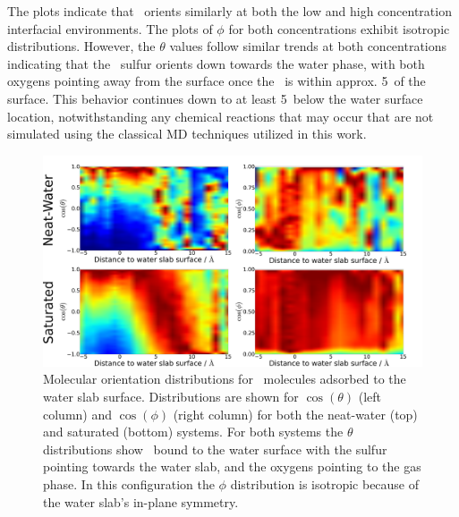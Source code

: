 The plots indicate that \suldiox~orients similarly at both the low and high concentration interfacial environments. The plots of $\phi$ for both concentrations exhibit isotropic distributions. However, the $\theta$ values follow similar trends at both concentrations indicating that the \suldiox~sulfur orients down towards the water phase, with both oxygens pointing away from the surface once the \suldiox~is within approx. 5\angs~of the surface. This behavior continues down to at least 5\angs~below the water surface location, notwithstanding any chemical reactions that may occur that are not simulated using the classical MD techniques utilized in this work.

\begin{figure}[h!]
	\begin{center}
		\includegraphics[scale=1.0]{images/so2-angles/so2-angles.png}
		\caption{Molecular orientation distributions for \suldiox~molecules adsorbed to the water slab surface. Distributions are shown for $\cos(\theta)$ (left column) and $\cos(\phi)$ (right column) for both the neat-water (top) and saturated (bottom) systems. For both systems the $\theta$ distributions show \suldiox~bound to the water surface with the sulfur pointing towards the water slab, and the oxygens pointing to the gas phase. In this configuration the $\phi$ distribution is isotropic because of the water slab's in-plane symmetry.}
		\label{fig:so2-orientation}
	\end{center}
\end{figure}
